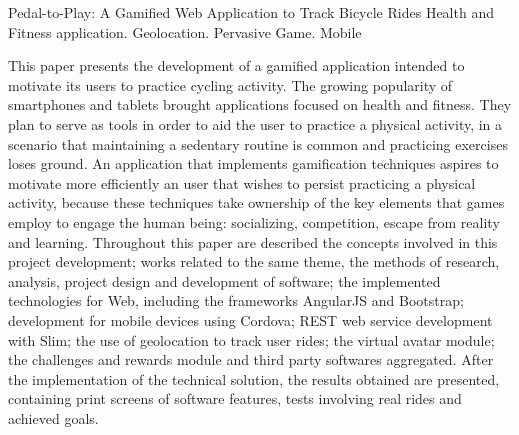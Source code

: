 \begin{englishabstract}
{Pedal-to-Play: A Gamified Web Application to Track Bicycle Rides}
{Health and Fitness application. Geolocation. Pervasive Game. Mobile}

This paper presents the development of a gamified application intended to motivate its users to practice cycling activity. The growing popularity of smartphones and tablets brought applications focused on health and  fitness. They plan to serve as tools in order to aid the user to practice a physical activity, in a scenario that maintaining a sedentary routine is common and practicing exercises loses ground. An application that implements gamification techniques aspires to motivate more efficiently an user that wishes to persist practicing a physical activity, because these techniques take ownership of the key elements that games employ to engage the human being: socializing, competition, escape from reality and learning. Throughout this paper are described the concepts involved in this project development; works related to the same theme, the methods of research, analysis, project design and development of software; the implemented technologies for Web, including the frameworks AngularJS and Bootstrap; development for mobile devices using Cordova; REST web service development with Slim; the use of geolocation to track user rides; the virtual avatar module; the challenges and rewards module and third party softwares aggregated. After the implementation of the technical solution, the results obtained are presented, containing print screens of software features, tests involving real rides and achieved goals.
\end{englishabstract}